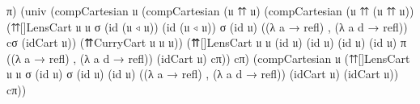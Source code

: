 \documentclass[
  11pt,
  oneside,
  article]{memoir}
\newenvironment{Shaded}{}{}
\newcommand{\NormalTok}[1]{#1}
\newcommand{\OtherTok}[1]{\textcolor[rgb]{0.00,0.44,0.13}{#1}}
\theoremstyle{definition}
\theoremstyle{plain}
\newcommand{\0}{\textsf{0}}
\newcommand{\1}{\tn{\textsf{1}}}
\begin{document}
\begin{Shaded}
\begin{Highlighting}[]
\NormalTok{                    π}\OtherTok{)}
            \OtherTok{(}\NormalTok{univ }\OtherTok{(}\NormalTok{compCartesian 𝔲 }
                    \OtherTok{(}\NormalTok{compCartesian }\OtherTok{(}\NormalTok{𝔲 ⇈ 𝔲}\OtherTok{)} 
                        \OtherTok{(}\NormalTok{compCartesian }\OtherTok{(}\NormalTok{𝔲 ⇈ }\OtherTok{(}\NormalTok{𝔲 ⇈ 𝔲}\OtherTok{))} 
                            \OtherTok{(}\NormalTok{⇈[]LensCart 𝔲 𝔲 σ }\OtherTok{(}\NormalTok{id }\OtherTok{(}\NormalTok{𝔲 ◃ 𝔲}\OtherTok{))} 
                                \OtherTok{(}\NormalTok{id }\OtherTok{(}\NormalTok{𝔲 ◃ 𝔲}\OtherTok{))}\NormalTok{ σ }\OtherTok{(}\NormalTok{id 𝔲}\OtherTok{)} 
                                \OtherTok{((λ}\NormalTok{ a }\OtherTok{→}\NormalTok{ refl}\OtherTok{)}\NormalTok{ , }\OtherTok{(λ}\NormalTok{ a d }\OtherTok{→}\NormalTok{ refl}\OtherTok{))} 
\NormalTok{                                cσ }\OtherTok{(}\NormalTok{idCart 𝔲}\OtherTok{))} 
                            \OtherTok{(}\NormalTok{⇈CurryCart 𝔲 𝔲 𝔲}\OtherTok{))} 
                        \OtherTok{(}\NormalTok{⇈[]LensCart 𝔲 𝔲 }\OtherTok{(}\NormalTok{id 𝔲}\OtherTok{)} \OtherTok{(}\NormalTok{id 𝔲}\OtherTok{)} \OtherTok{(}\NormalTok{id 𝔲}\OtherTok{)} \OtherTok{(}\NormalTok{id 𝔲}\OtherTok{)}\NormalTok{ π}
                                     \OtherTok{((λ}\NormalTok{ a }\OtherTok{→}\NormalTok{ refl}\OtherTok{)}\NormalTok{ , }\OtherTok{(λ}\NormalTok{ a d }\OtherTok{→}\NormalTok{ refl}\OtherTok{))} 
                                     \OtherTok{(}\NormalTok{idCart 𝔲}\OtherTok{)}\NormalTok{ cπ}\OtherTok{))} 
\NormalTok{                    cπ}\OtherTok{)}
                  \OtherTok{(}\NormalTok{compCartesian 𝔲 }
                    \OtherTok{(}\NormalTok{⇈[]LensCart 𝔲 𝔲 σ }\OtherTok{(}\NormalTok{id 𝔲}\OtherTok{)}\NormalTok{ σ }\OtherTok{(}\NormalTok{id 𝔲}\OtherTok{)} \OtherTok{(}\NormalTok{id 𝔲}\OtherTok{)} 
                        \OtherTok{((λ}\NormalTok{ a }\OtherTok{→}\NormalTok{ refl}\OtherTok{)}\NormalTok{ , }\OtherTok{(λ}\NormalTok{ a d }\OtherTok{→}\NormalTok{ refl}\OtherTok{))} 
                        \OtherTok{(}\NormalTok{idCart 𝔲}\OtherTok{)} \OtherTok{(}\NormalTok{idCart 𝔲}\OtherTok{))} 
\NormalTok{                    cπ}\OtherTok{))}
    

\end{Highlighting}
\end{Shaded}
\end{document}
